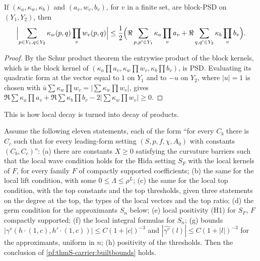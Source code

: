 \begin{lemma}\label{pf:thmS-carrier:blockschur}
If $(\kappa_a,\kappa_w,\kappa_b)$ and $(a_v,w_v,b_v)$, for $v$ in a finite set, are block-PSD on $(Y_1,Y_2)$, then
\begin{equation}\label{eq:pf:thmS-carrier:blockschur}
\Bigl|\sum_{p\in Y_1,q\in Y_2}\kappa_w(p,q)\prod_vw_v(p,q)\Bigr|\le\frac12\Bigl(\Re\sum_{p,p'\in Y_1}\kappa_a\prod_va_v+
\Re\sum_{q,q'\in Y_2}\kappa_b\prod_vb_v\Bigr).
\end{equation}
\end{lemma}

\begin{proof}
By the Schur product theorem the entrywise product of the block kernels, which is the block kernel of
$(\kappa_a\prod a_v,\kappa_w\prod w_v,\kappa_b\prod b_v)$, is PSD. Evaluating its quadratic form at the vector equal to $1$ on
$Y_1$ and to $-u$ on $Y_2$, where $|u|=1$ is chosen with $\bar u\sum\kappa_w\prod w_v=|\sum\kappa_w\prod w_v|$, gives
$\Re\sum\kappa_a\prod a_v+\Re\sum\kappa_b\prod b_v-2|\sum\kappa_w\prod w_v|\ge0$.
\end{proof}

This is how local decay is turned into decay of products.

\begin{theorem}\label{pf:thmS-carrier:core}
Assume the following eleven statements, each of the form ``for every $C_b$ there is $C_c$ such that for every leading-form
setting $(S,p,f,\chi,A_0)$ with constants $(C_b,C_c)$'':
(a) there are constants $X\ge0$ satisfying the curvature barriers such that the local wave condition holds for the Hida setting
$S_F$ with the local kernels of $F$, for every family $F$ of compactly supported coefficients; (b) the same for the local lift
condition, with some $0\le\Lambda\le\rho^L$; (c) the same for the local top condition, with the top constants and the top
thresholds, given three statements on the degree at the top, the types of the local vectors and the top ratio; (d) the germ
condition for the approximants $S_n$ below; (e) local positivity (H1) for $S_F$, $F$ compactly supported; (f) the local
integral formulas for $S_n$; (g) bounds $|\gamma^v(h\cdot(1,c),h'\cdot(1,c))|\le C(1+|c|)^{-3}$ and $|\widehat{\gamma^v}(l)|\le
C(1+|l|)^{-3}$ for the approximants, uniform in $n$; (h) positivity of the thresholds. Then the conclusion of
\cref{pf:thmS-carrier:builtbounds} holds.
\end{theorem}

